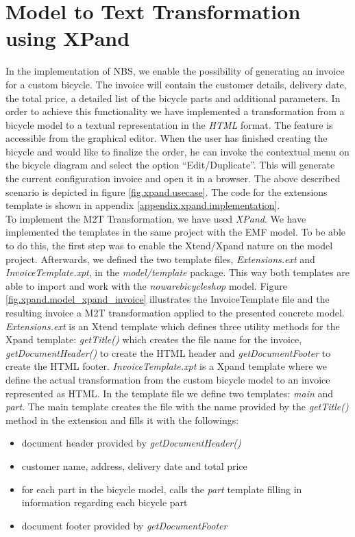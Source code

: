 \section{Model to Text Transformation using XPand}
\label{sec.m2t}
\noindent In the implementation of NBS, we enable the possibility of
generating an invoice for a custom bicycle. The invoice will contain the
customer details, delivery date, the total price, a detailed
list of the bicycle parts and additional parameters. In
order to achieve this functionality we have implemented a transformation from a
bicycle model to a textual representation in the \emph{HTML} format. The
feature is accessible from the graphical editor. When the user has finished
creating the bicycle and would like to finalize the order, he can invoke the
contextual menu on the bicycle diagram and select the option ``Edit/Duplicate''. This will generate the current configuration invoice and open it in a browser. The above described scenario is depicted in figure \ref{fig.xpand.usecase}. The
code for the extensions template is shown in appendix
\ref{appendix.xpand.implementation}.\\

\noindent To implement the M2T Transformation, we have used \emph{XPand}. We
have implemented the templates in the same project with the EMF model. To be able to
do this, the first step was to enable the Xtend/Xpand nature on the model
project. Afterwards, we defined the two template files, \emph{Extensions.ext}
and \emph{InvoiceTemplate.xpt}, in the \emph{model/template} package. This way
both templates are able to import and work with the \emph{nowarebicycleshop}
model. Figure \ref{fig.xpand.model_xpand_invoice} illustrates the
InvoiceTemplate file and the resulting invoice a M2T transformation applied to
the presented concrete model.\\

\noindent \emph{Extensions.ext} is an Xtend template which defines three utility
methods for the Xpand template: \emph{getTitle()} which creates the file name
for the invoice, \emph{getDocumentHeader()} to create the HTML header and
\emph{getDocumentFooter} to create the HTML footer. \emph{InvoiceTemplate.xpt}
is a Xpand template where we define the actual transformation from the custom
bicycle model to an invoice represented as HTML. In the template file we define
two templates: \emph{main} and \emph{part}. The main template creates the file
with the name provided by the \emph{getTitle()} method in the extension and
fills it with the followings:
\begin{itemize}
  \item document header provided by \emph{getDocumentHeader()}
  \item customer name, address, delivery date and total price
  \item for each part in the bicycle model, calls the \emph{part} template
  filling in information regarding each bicycle part
  \item document footer provided by \emph{getDocumentFooter}\\
\end{itemize}

